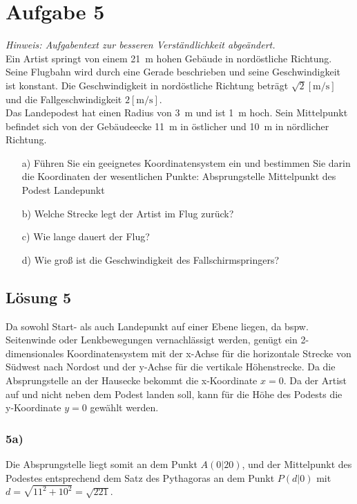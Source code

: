 \section*{Aufgabe 5}
\textit{Hinweis: Aufgabentext zur besseren Verständlichkeit abgeändert.}\\
Ein Artist springt von einem \SI{21}{\meter} hohen Gebäude in nordöstliche Richtung. Seine Flugbahn wird durch eine Gerade beschrieben und seine Geschwindigkeit ist konstant. 
Die Geschwindigkeit in nordöstliche Richtung beträgt $\sqrt{2}[\si{\meter\per\second}]$ und die Fallgeschwindigkeit $2[\si{\meter\per\second}]$.\\
Das Landepodest hat einen Radius von \SI{3}{\meter} und ist \SI{1}{\meter} hoch. Sein Mittelpunkt befindet sich von der Gebäudeecke \SI{11}{\meter} in östlicher und \SI{10}{\meter} in nördlicher Richtung.

\begin{enumerate}
	\item[a)] Führen Sie ein geeignetes Koordinatensystem ein und bestimmen Sie darin die Koordinaten der wesentlichen Punkte:
	\subitem Absprungstelle
	\subitem Mittelpunkt des Podest
	\subitem Landepunkt
	\item[b)] Welche Strecke legt der Artist im Flug zurück?
	\item[c)] Wie lange dauert der Flug?
	\item[d)] Wie groß ist die Geschwindigkeit des Fallschirmspringers?
\end{enumerate}

\subsection*{Lösung 5}
Da sowohl Start- als auch Landepunkt auf einer Ebene liegen, da bspw. Seitenwinde oder Lenkbewegungen vernachlässigt werden, genügt ein 2-dimensionales Koordinatensystem mit der x-Achse für die horizontale Strecke von Südwest nach Nordost und der y-Achse für die vertikale Höhenstrecke.
Da die Absprungstelle an der Hausecke bekommt die x-Koordinate $x=0$. 
Da der Artist auf und nicht neben dem Podest landen soll, kann für die Höhe des Podests die y-Koordinate $y=0$ gewählt werden.

\subsubsection*{5a)}
Die Absprungstelle liegt somit an dem Punkt $A(0|20)$, und der Mittelpunkt des Podestes entsprechend dem Satz des Pythagoras an dem Punkt $P(d|0)$ mit $d=\sqrt{11^2+10^2}=\sqrt{221}$.\\

